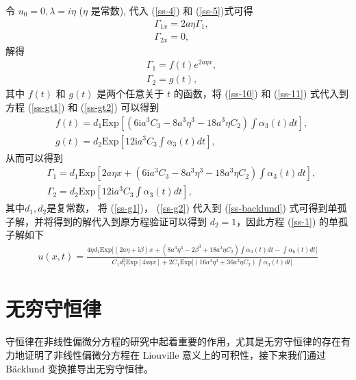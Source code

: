 令 $u_{0} = 0, \lambda = i\eta$ ($\eta$ 是常数), 代入 (\ref{ss-4}) 和  (\ref{ss-5})式可得
\begin{align}
  & \Gamma_{1x} = 2a\eta\Gamma_{1}, \\
  & \Gamma_{2x} = 0,
\end{align}
解得
\begin{align}
  & \Gamma_{1} = f(t)e^{2a\eta x},  \label{ss-10}\\
  & \Gamma_{2} = g(t), \label{ss-11}
\end{align}
其中 $f(t)$ 和 $g(t)$ 是两个任意关于  $t$ 的函数，将 (\ref{ss-10}) 和 (\ref{ss-11}) 式代入到方程 (\ref{ss-gt1}) 和 (\ref{ss-gt2}) 可以得到
\begin{align}
  & f(t) = d_{1}\mathrm{Exp}\left[(6\mathrm{i}a^{3}C_{3} - 8a^{3}\eta^{3} - 18a^{3}\eta C_{2})\int \alpha_{3}(t)dt\right], \\
  & g(t) = d_{2}\mathrm{Exp}\left[12\mathrm{i}a^{3}C_{3}\int \alpha_{3}(t)dt\right],
\end{align}
从而可以得到
\begin{align}
  & \Gamma_{1} = d_{1}\mathrm{Exp}\left[2a\eta x + (6\mathrm{i}a^{3}C_{3} - 8a^{3}\eta^{3} - 18a^{3}\eta C_{2})\int \alpha_{3}(t)dt\right], \label{ss-g1} \\
  & \Gamma_{2} = d_{2}\mathrm{Exp}\left[12\mathrm{i}a^{3}C_{3}\int \alpha_{3}(t)dt\right], \label{ss-g2}
\end{align}
其中$d_{1}, d_{2}$是复常数， 将  (\ref{ss-g1})， (\ref{ss-g2}) 代入到  (\ref{ss-backlund}) 式可得到单孤子解，并将得到的解代入到原方程验证可以得到 $d_{2} = 1$，因此方程 (\ref{ss-1}) 的单孤子解如下
\begin{align}
  u(x,t) = \frac{4\eta d_{1}\mathrm{Exp}\Big[(2a\eta+\mathrm{i}\beta)x + (8a^{3}\eta^{3} - 2\beta^{3} + 18a^{3}\eta C_{2})\int \alpha_{3}(t)dt - \int \alpha_{6}(t)dt\Big]}{C_1 d_{1}^{2}\mathrm{Exp}[4a\eta x] + 2C_1 \mathrm{Exp}\Big[(16a^{3}\eta^{3}+36a^{3}\eta C_{2})\int \alpha_{3}(t)dt\Big]}
\end{align}

\section{无穷守恒律}
守恒律在非线性偏微分方程的研究中起着重要的作用，尤其是无穷守恒律的存在有力地证明了非线性偏微分方程在 Liouville 意义上的可积性，接下来我们通过 B\"{a}cklund 变换推导出无穷守恒律。

